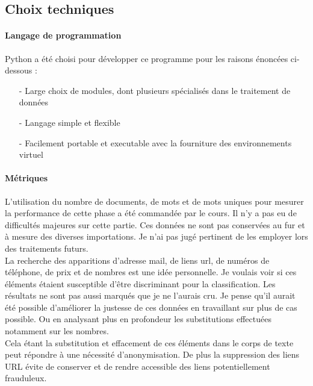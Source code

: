 \subsection*{Choix techniques}
    \paragraph{Langage de programmation}
        Python a été choisi pour développer ce programme pour les raisons énoncées ci-dessous :
        \begin{itemize}
            \item[-] Large choix de modules, dont plusieurs spécialisés dans le traitement de données
            \item[-] Langage simple et flexible
            \item[-] Facilement portable et executable avec la fourniture des environnements virtuel
        \end{itemize}

    \paragraph{Métriques}
        L'utilisation du nombre de documents, de mots et de mots uniques pour mesurer la performance de cette phase a été commandée par le cours.
        Il n'y a pas eu de difficultés majeures sur cette partie.
        Ces données ne sont pas conservées au fur et à mesure des diverses importations.
        Je n'ai pas jugé pertinent de les employer lors des traitements futurs. \\

        La recherche des apparitions d'adresse mail, de liens url, de numéros de téléphone, de prix et de nombres est une idée personnelle.
        Je voulais voir si ces éléments étaient susceptible d'être discriminant pour la classification.
        Les résultats ne sont pas aussi marqués que je ne l'aurais cru.
        Je pense qu'il aurait été possible d'améliorer la justesse de ces données en travaillant sur plus de cas possible.
        Ou en analysant plus en profondeur les substitutions effectuées notamment sur les nombres.\\
        Cela étant la substitution et effacement de ces éléments dans le corps de texte peut répondre à une nécessité d'anonymisation.
        De plus la suppression des liens URL évite de conserver et de rendre accessible des liens potentiellement frauduleux.\\

